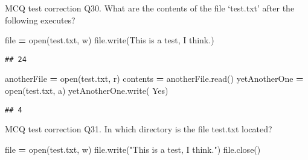 \documentclass[
  8pt,
  ignorenonframetext,
]{beamer}
\newenvironment{Shaded}{\begin{snugshade}}{\end{snugshade}}
\newcommand{\BuiltInTok}[1]{#1}
\newcommand{\NormalTok}[1]{#1}
\newcommand{\OperatorTok}[1]{\textcolor[rgb]{0.81,0.36,0.00}{\textbf{#1}}}
\newcommand{\StringTok}[1]{\textcolor[rgb]{0.31,0.60,0.02}{#1}}
\begin{document}
\begin{frame}[fragile]{MCQ test correction}
\protect\hypertarget{mcq-test-correction-59}{}
Q30. What are the contents of the file `test.txt' after the following
executes?

\begin{Shaded}
\begin{Highlighting}[]
\BuiltInTok{file} \OperatorTok{=} \BuiltInTok{open}\NormalTok{(}\StringTok{\textquotesingle{}test.txt\textquotesingle{}}\NormalTok{, }\StringTok{\textquotesingle{}w\textquotesingle{}}\NormalTok{)}
\BuiltInTok{file}\NormalTok{.write(}\StringTok{\textquotesingle{}This is a test, I think.\textquotesingle{}}\NormalTok{)}
\end{Highlighting}
\end{Shaded}

\begin{verbatim}
## 24
\end{verbatim}

\begin{Shaded}
\begin{Highlighting}[]
\NormalTok{anotherFile }\OperatorTok{=} \BuiltInTok{open}\NormalTok{(}\StringTok{\textquotesingle{}test.txt\textquotesingle{}}\NormalTok{, }\StringTok{\textquotesingle{}r\textquotesingle{}}\NormalTok{)}
\NormalTok{contents }\OperatorTok{=}\NormalTok{ anotherFile.read()}
\NormalTok{yetAnotherOne }\OperatorTok{=} \BuiltInTok{open}\NormalTok{(}\StringTok{\textquotesingle{}test.txt\textquotesingle{}}\NormalTok{, }\StringTok{\textquotesingle{}a\textquotesingle{}}\NormalTok{)}
\NormalTok{yetAnotherOne.write(}\StringTok{\textquotesingle{} Yes\textquotesingle{}}\NormalTok{)}
\end{Highlighting}
\end{Shaded}

\begin{verbatim}
## 4
\end{verbatim}
\end{frame}

\begin{frame}[fragile]{MCQ test correction}
\protect\hypertarget{mcq-test-correction-60}{}
Q31. In which directory is the file test.txt located?

\begin{Shaded}
\begin{Highlighting}[]
\BuiltInTok{file} \OperatorTok{=} \BuiltInTok{open}\NormalTok{(}\StringTok{\textquotesingle{}test.txt\textquotesingle{}}\NormalTok{, }\StringTok{\textquotesingle{}w\textquotesingle{}}\NormalTok{)}
\BuiltInTok{file}\NormalTok{.write(}\StringTok{"This is a test, I think."}\NormalTok{)}
\BuiltInTok{file}\NormalTok{.close()}
\end{Highlighting}
\end{Shaded}
\end{frame}
\end{document}
